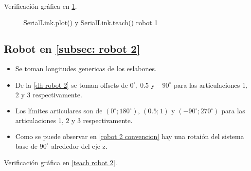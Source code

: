 \documentclass[a4paper,12pt]{article}
\begin{document}
Verificación gráfica en \cref{teach robot 1}.

\begin{figure}[htpb]
    \centering
    \begin{adjustbox}{max width=\columnwidth}
    \end{adjustbox}
    \caption{SerialLink.plot() y SerialLink.teach() robot 1}
    \label{teach robot 1}
\end{figure}

\subsection{Robot en \cref{subsec: robot 2}}
\begin{itemize}
    \item Se toman longitudes genericas de los eslabones.
    \item De la \cref{dh robot 2} se toman offsets de $0^\circ$, $0.5$ y $-90^\circ$ para las articulaciones 1, 2 y 3 respectivamente.
    \item Los límites articulares son de $\left(0^\circ; 180^\circ\right)$, $\left(0.5; 1\right)$ y $\left(-90^\circ; 270^\circ\right)$ para las articulaciones 1, 2 y 3 respectivamente.
    \item Como se puede observar en \cref{robot 2 convencion} hay una rotaión del sistema base de $90^\circ$ alrededor del eje z.
\end{itemize}

Verificación gráfica en \cref{teach robot 2}.
\end{document}
